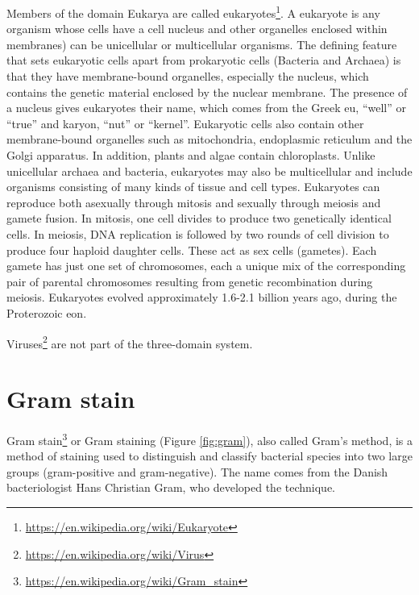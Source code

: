\documentclass[]{book}
\let\rmarkdownfootnote\footnote%
\def\footnote{\protect\rmarkdownfootnote}
\renewcommand{\href}[2]{#2\footnote{\url{#1}}}
\theoremstyle{definition}
\theoremstyle{definition}
\theoremstyle{definition}
\theoremstyle{remark}
\begin{document}
Members of the domain Eukarya are called
\href{https://en.wikipedia.org/wiki/Eukaryote}{eukaryotes}. A eukaryote
is any organism whose cells have a cell nucleus and other organelles
enclosed within membranes) can be unicellular or multicellular
organisms. The defining feature that sets eukaryotic cells apart from
prokaryotic cells (Bacteria and Archaea) is that they have
membrane-bound organelles, especially the nucleus, which contains the
genetic material enclosed by the nuclear membrane. The presence of a
nucleus gives eukaryotes their name, which comes from the Greek eu,
``well'' or ``true'' and karyon, ``nut'' or ``kernel''. Eukaryotic cells
also contain other membrane-bound organelles such as mitochondria,
endoplasmic reticulum and the Golgi apparatus. In addition, plants and
algae contain chloroplasts. Unlike unicellular archaea and bacteria,
eukaryotes may also be multicellular and include organisms consisting of
many kinds of tissue and cell types. Eukaryotes can reproduce both
asexually through mitosis and sexually through meiosis and gamete
fusion. In mitosis, one cell divides to produce two genetically
identical cells. In meiosis, DNA replication is followed by two rounds
of cell division to produce four haploid daughter cells. These act as
sex cells (gametes). Each gamete has just one set of chromosomes, each a
unique mix of the corresponding pair of parental chromosomes resulting
from genetic recombination during meiosis. Eukaryotes evolved
approximately 1.6-2.1 billion years ago, during the Proterozoic eon.

\href{https://en.wikipedia.org/wiki/Virus}{Viruses} are not part of the
three-domain system.

\section{Gram stain}\label{gram-stain}

\href{https://en.wikipedia.org/wiki/Gram_stain}{Gram stain} or Gram
staining (Figure \ref{fig:gram}), also called Gram's method, is a method
of staining used to distinguish and classify bacterial species into two
large groups (gram-positive and gram-negative). The name comes from the
Danish bacteriologist Hans Christian Gram, who developed the technique.
\end{document}
